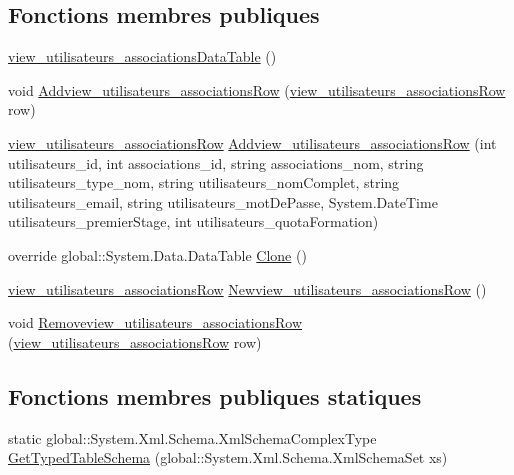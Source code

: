 \subsection*{Fonctions membres publiques}
\begin{DoxyCompactItemize}
\item 
\hyperlink{classforma_1_1formadb_data_set_1_1view__utilisateurs__associations_data_table_ae1b03ce76a73f933cdb5a224a50c8448}{view\+\_\+utilisateurs\+\_\+associations\+Data\+Table} ()
\item 
void \hyperlink{classforma_1_1formadb_data_set_1_1view__utilisateurs__associations_data_table_ac43d5c226535c2fe63f2ada4cdfb7eff}{Addview\+\_\+utilisateurs\+\_\+associations\+Row} (\hyperlink{classforma_1_1formadb_data_set_1_1view__utilisateurs__associations_row}{view\+\_\+utilisateurs\+\_\+associations\+Row} row)
\item 
\hyperlink{classforma_1_1formadb_data_set_1_1view__utilisateurs__associations_row}{view\+\_\+utilisateurs\+\_\+associations\+Row} \hyperlink{classforma_1_1formadb_data_set_1_1view__utilisateurs__associations_data_table_ae08017f8540dd23b9a5ce8740935b9dc}{Addview\+\_\+utilisateurs\+\_\+associations\+Row} (int utilisateurs\+\_\+id, int associations\+\_\+id, string associations\+\_\+nom, string utilisateurs\+\_\+type\+\_\+nom, string utilisateurs\+\_\+nom\+Complet, string utilisateurs\+\_\+email, string utilisateurs\+\_\+mot\+De\+Passe, System.\+Date\+Time utilisateurs\+\_\+premier\+Stage, int utilisateurs\+\_\+quota\+Formation)
\item 
override global\+::\+System.\+Data.\+Data\+Table \hyperlink{classforma_1_1formadb_data_set_1_1view__utilisateurs__associations_data_table_a34ebb4a0436541174d6a69e00e6973a9}{Clone} ()
\item 
\hyperlink{classforma_1_1formadb_data_set_1_1view__utilisateurs__associations_row}{view\+\_\+utilisateurs\+\_\+associations\+Row} \hyperlink{classforma_1_1formadb_data_set_1_1view__utilisateurs__associations_data_table_afa4134d969a8b508b0901de599597d06}{Newview\+\_\+utilisateurs\+\_\+associations\+Row} ()
\item 
void \hyperlink{classforma_1_1formadb_data_set_1_1view__utilisateurs__associations_data_table_a6afb03cad6a90003958637a36625534d}{Removeview\+\_\+utilisateurs\+\_\+associations\+Row} (\hyperlink{classforma_1_1formadb_data_set_1_1view__utilisateurs__associations_row}{view\+\_\+utilisateurs\+\_\+associations\+Row} row)
\end{DoxyCompactItemize}
\subsection*{Fonctions membres publiques statiques}
\begin{DoxyCompactItemize}
\item 
static global\+::\+System.\+Xml.\+Schema.\+Xml\+Schema\+Complex\+Type \hyperlink{classforma_1_1formadb_data_set_1_1view__utilisateurs__associations_data_table_a4a17e8a08243dd2356922e069c7a2509}{Get\+Typed\+Table\+Schema} (global\+::\+System.\+Xml.\+Schema.\+Xml\+Schema\+Set xs)
\end{DoxyCompactItemize}
